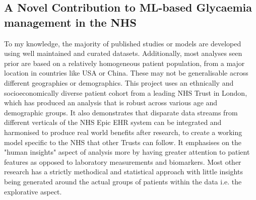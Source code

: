 
\subsection{A Novel Contribution to ML-based Glycaemia management in the NHS}

\vspace{5pt}
\noindent To my knowledge, the majority of published studies or models are developed using well maintained and curated datasets. Additionally, most analyses seen prior are based on a relatively homogeneous patient population, from a major location in countries like USA or China. These may not be generalisable across different geographies or demographics. This project uses an ethnically and socioeconomically diverse patient cohort from a leading NHS Trust in London, which has produced an analysis that is robust across various age and demographic groups. It also demonstrates that disparate data streams from different verticals of the NHS Epic EHR system can be integrated and harmonised to produce real world benefits after research, to create a working model specific to the NHS that other Trusts can follow. It emphasises on the "human insights" aspect of analysis more by having greater attention to patient features as opposed to laboratory measurements and biomarkers. Most other research has a strictly methodical and statistical approach with little insights being generated around the actual groups of patients within the data i.e. the explorative aspect. 
 